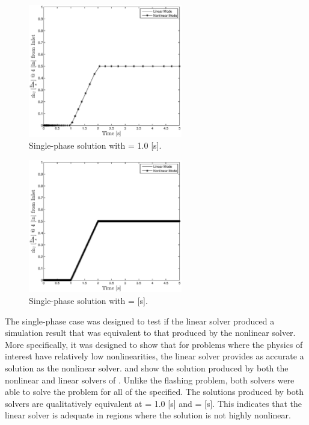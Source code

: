 \begin{figure}[h!tb]
\centering
\includegraphics[width=0.6\textwidth]{plots/single_1em0.eps}
\caption{Single-phase solution with \dtmax{} = 1.0 {[s]}.}
\label{fig:single_1em1}
\end{figure}

\begin{figure}[h!tb]
\centering
\includegraphics[width=0.6\textwidth]{plots/single_1em5.eps}
\caption{Single-phase solution with \dtmax{} =  {[s]}.}
\label{fig:single_1em5}
\end{figure}

The single-phase case was designed to test if the linear solver produced a simulation result that was equivalent to that produced by the nonlinear solver.
More specifically, it was designed to show that for problems where the physics of interest have relatively low nonlinearities, the linear solver provides as accurate a solution as the nonlinear solver.
 and  show the solution produced by both the nonlinear and linear solvers of \cobra{}.
Unlike the flashing problem, both solvers were able to solve the problem for all of the \dtmax{} specified.
The solutions produced by both solvers are qualitatively equivalent at \dtmax{} = 1.0 [s] and \dtmax{} =  [s].
This indicates that the linear solver is adequate in regions where the solution is not highly nonlinear.

